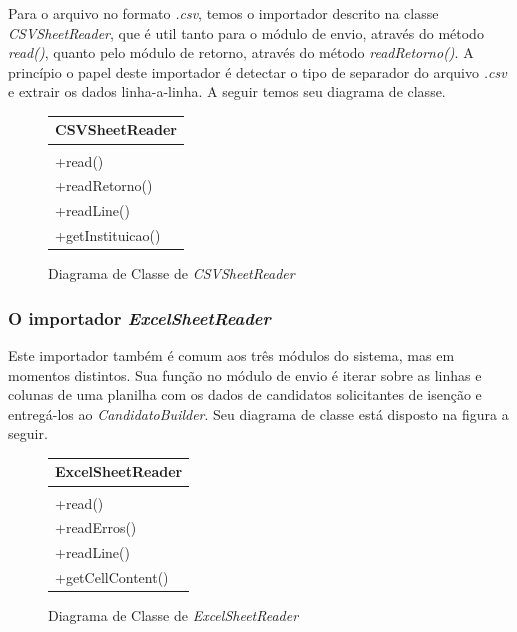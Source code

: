 \documentclass[
	12pt,			%
	openright,		%
	oneside,	
	a4paper,		%
	english,		%
	brazil			%
]{abntex2/abntex2}  %
\begin{document}
					Para o arquivo no formato \textit{.csv}, temos o importador descrito na classe \textit{CSVSheetReader}, que é util tanto para o módulo de envio, através do método \textit{read()}, quanto pelo módulo de retorno, através do método \textit{readRetorno()}. A princípio o papel deste importador é detectar o tipo de separador do arquivo \textit{.csv} e extrair os dados linha-a-linha. A seguir temos seu diagrama de classe.
	
					\begin{figure}[H]
						\begin{center}
							
							\caption{Diagrama de Classe de \textit{CSVSheetReader}}
							\label{csvreader-uml}
							
							\begin{tabular}{|l|}
								\hline
								\multicolumn{1}{|c|}{\textbf{CSVSheetReader}} \\ \hline
								\\ \hline
								+read() \\
								+readRetorno() \\
								+readLine() \\
								+getInstituicao() \\ \hline
							\end{tabular}
							
						\end{center}
					\end{figure}
	
				\subsubsection{O importador \textit{ExcelSheetReader}}

					Este importador também é comum aos três módulos do sistema, mas em momentos distintos. Sua função no módulo de envio é iterar sobre as linhas e colunas de uma planilha com os dados de candidatos solicitantes de isenção e entregá-los ao \textit{CandidatoBuilder}. Seu diagrama de classe está disposto na figura a seguir.

					\begin{figure}[ht]
						\begin{center}
							
							\caption{Diagrama de Classe de \textit{ExcelSheetReader}}
							\label{excelreader-uml}
							
							\begin{tabular}{|l|}
								\hline
								\multicolumn{1}{|c|}{\textbf{ExcelSheetReader}} \\ \hline
								\\ \hline
								+read() \\
								+readErros() \\
								+readLine() \\
								+getCellContent() \\ \hline
							\end{tabular}
							
						\end{center}
					\end{figure}
	
\end{document}
